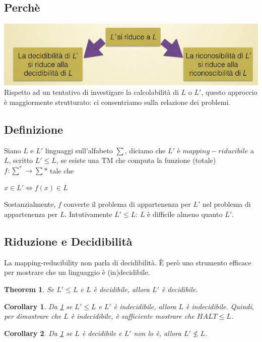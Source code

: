 \documentclass[a4paper, 12pt]{article}
\newtheorem{theorem}{Theorem}[section]
\newtheorem{corollary}{Corollary}[theorem]
\begin{document}
\subsection{Perch\`e}
\includegraphics[scale=0.5]{mapred1.png}\\
Rispetto ad un tentativo di investigare la calcolabilit\`a di $L$ o $L'$, questo approccio \`e maggiormente strutturato: ci consentriamo sulla relazione dei problemi.
\subsection{Definizione}
Siano $L$ e $L'$ linguaggi sull'alfabeto $\sum$, diciamo che $L'$ \`e $mapping-riducibile$ a $L$, scritto $L' \leq L$, se esiste una TM che computa la funzione (totale) $f: \sum^* \rightarrow \sum*$ tale che 
\begin{center}
$x \in L' \iff f(x) \in L$
\end{center}
Sostanzialmente, $f$ converte il problema di appartenenza per $L'$ nel problema di appartenenza per $L$. Intutivamente $L' \leq L$: $L$ \`e difficile almeno quanto $L'$.
\subsection{Riduzione e Decidibilit\`a}
La mapping-reducibility non parla di decidibilit\`a. \`E per\`o uno strumento efficace per mostrare che un linguaggio \`e (in)decidibile.
\begin{theorem}
\label{th:4}
Se $L' \leq L$ e $L$ \`e decidibile, allora $L'$ \`e decidibile.
\end{theorem}
\begin{corollary}
Da \ref{th:4} se $L' \leq L$ e $L'$ \`e indecidibile, allora $L$ \`e indecidibile. Quindi, per dimostrare che $L$ \`e indecidibile, \`e sufficiente mostrare che $HALT \leq L$.
\end{corollary}
\begin{corollary}
Da \ref{th:4} se $L$ \`e decidibile e $L'$ non lo \`e, allora $L' \nleq L$.
\end{corollary}
\end{document}
